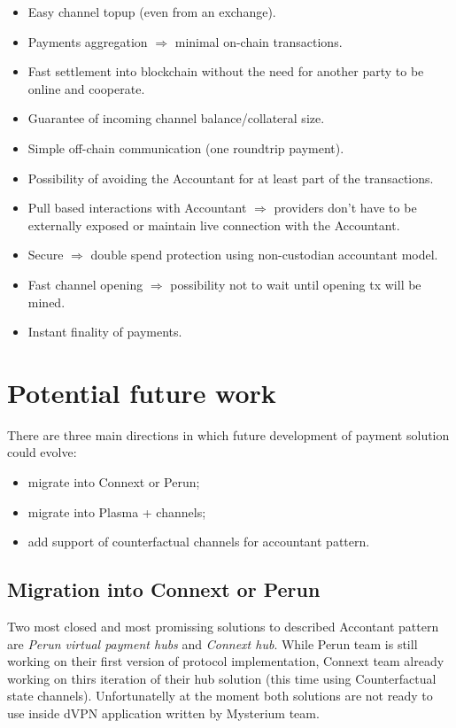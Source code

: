 \documentclass[a4paper,12pt]{article}
\begin{document}
\begin{itemize}
    \item Easy channel topup (even from an exchange).
    \item Payments aggregation $\Longrightarrow$ minimal on-chain transactions.
    \item Fast settlement into blockchain without the need for another party to 
    be online and cooperate.
    \item Guarantee of incoming channel balance/collateral size.
    \item Simple off-chain communication (one roundtrip payment).
    \item Possibility of avoiding the Accountant for at least part of the 
    transactions.
    \item Pull based interactions with Accountant $\Longrightarrow$ providers don’t
    have to be externally exposed or maintain live connection with the Accountant.
    \item Secure $\Longrightarrow$ double spend protection using non-custodian 
    accountant model.
    \item Fast channel opening $\Longrightarrow$ possibility not to wait until 
    opening tx will be mined.
    \item Instant finality of payments.
\end{itemize}

\section{Potential future work}

There are three main directions in which future development of payment solution
could evolve: 
\begin{itemize}
    \item migrate into Connext or Perun;
    \item migrate into Plasma + channels;
    \item add support of counterfactual channels for accountant pattern.
\end{itemize}

\subsection{Migration into Connext or Perun}

Two most closed and most promissing solutions to described Accontant pattern are
\textit{Perun virtual payment hubs} and \textit{Connext hub}. While Perun team 
is still working on their first version of protocol implementation, Connext team 
already working on thirs iteration of their hub solution (this time using 
Counterfactual state channels). Unfortunatelly at the moment both solutions are
not ready to use inside dVPN application written by Mysterium team. 
\end{document}

